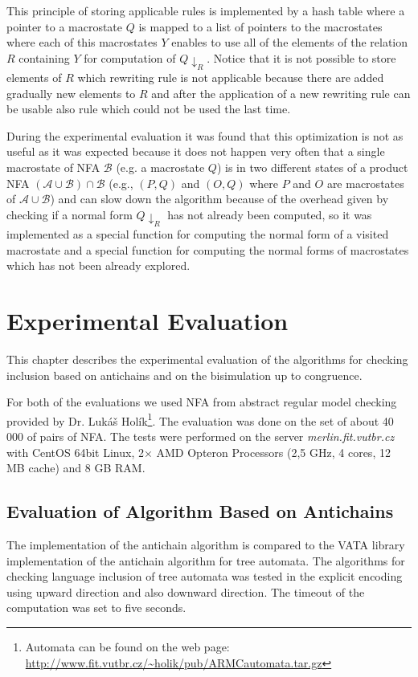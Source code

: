 This principle of storing applicable rules is implemented by a hash table where a pointer to a macrostate $Q$ is mapped to
a list of pointers to the macrostates where each of this macrostates $Y$ enables to use all of the elements of the relation $R$ containing $Y$ 
for computation of $Q{\downarrow_R}$.
Notice that it is not possible to store elements of $R$ which rewriting rule is not applicable because there are added gradually
new elements to $R$ and after the application of a new rewriting rule can be usable also rule which could not be used the last time.

During the experimental evaluation it was found that this optimization is not as useful as it was expected because it does not happen very often that a single
macrostate of NFA $\mathcal{B}$ (e.g. a macrostate $Q$) is in two different states of a 
product NFA $(\mathcal{A}\cup\mathcal{B})\cap\mathcal{B}$ (e.g., $(P,Q)$
and $(O,Q)$ where $P$ and $O$ are macrostates of $\mathcal{A}\cup\mathcal{B}$) and can slow down the algorithm because of the overhead given by checking
if a normal form $Q{\downarrow_R}$ has not already been computed, so it was implemented as a special function for computing the 
normal form of a visited macrostate and a special function for computing the normal forms of macrostates which has not been already explored. 

\chapter{Experimental Evaluation}
\label{eval}
This chapter describes the experimental evaluation of the algorithms for checking inclusion based on antichains and on the bisimulation up to congruence. 

For both of the evaluations we used NFA from abstract regular model checking provided by Dr. Lukáš Holík\footnote{
Automata can be found on the web page: \url{http://www.fit.vutbr.cz/~holik/pub/ARMCautomata.tar.gz}}.  
The evaluation was done on the set of about 40 000 of pairs of NFA. 
The tests were performed on the server \emph{merlin.fit.vutbr.cz} with CentOS 64bit Linux, 2$\times$ AMD Opteron Processors (2,5 GHz, 4 cores, 12 MB cache)
and 8 GB RAM.

\section{Evaluation of Algorithm Based on Antichains}
The implementation of the antichain algorithm is compared to the VATA library implementation of the antichain algorithm for tree automata. The
algorithms for checking language inclusion of tree automata was tested in the explicit encoding using upward direction and also downward direction. 
The timeout of the computation was set to five seconds.

